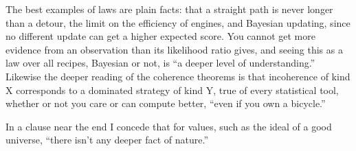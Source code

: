 The best examples of laws are plain facts: that a straight path is never longer than a detour, the limit on the efficiency of engines, and Bayesian updating, since no different update can get a higher expected score.  You cannot get more evidence from an observation than its likelihood ratio gives, and seeing this as a law over all recipes, Bayesian or not, is ``a deeper level of understanding.'' Likewise the deeper reading of the coherence theorems is that incoherence of kind X corresponds to a dominated strategy of kind Y, true of every statistical tool, whether or not you care or can compute better, ``even if you own a bicycle.''

In a clause near the end I concede that for values, such as the ideal of a good universe, ``there isn't any deeper fact of nature.'' 
